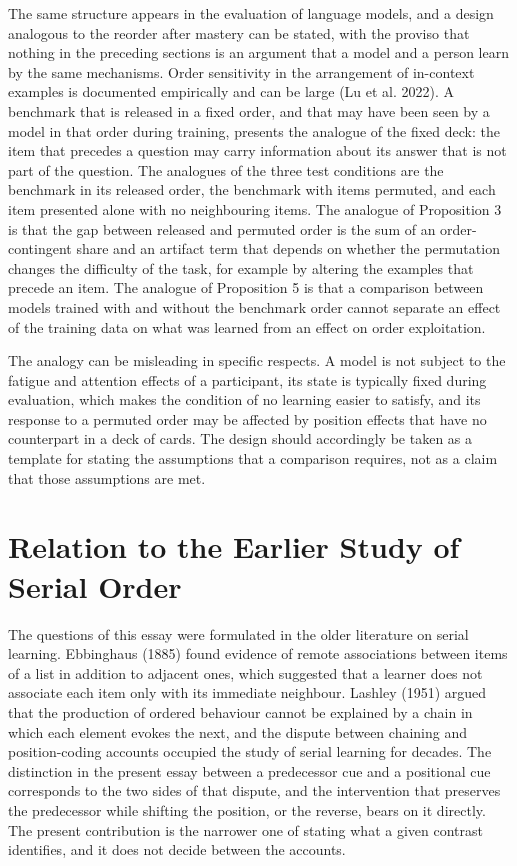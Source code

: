 \documentclass[11pt]{article}
\theoremstyle{remark}
\begin{document}
The same structure appears in the evaluation of language models, and a design analogous to the reorder after mastery can be stated, with the proviso that nothing in the preceding sections is an argument that a model and a person learn by the same mechanisms. Order sensitivity in the arrangement of in-context examples is documented empirically and can be large (Lu et al. 2022). A benchmark that is released in a fixed order, and that may have been seen by a model in that order during training, presents the analogue of the fixed deck: the item that precedes a question may carry information about its answer that is not part of the question. The analogues of the three test conditions are the benchmark in its released order, the benchmark with items permuted, and each item presented alone with no neighbouring items. The analogue of Proposition 3 is that the gap between released and permuted order is the sum of an order-contingent share and an artifact term that depends on whether the permutation changes the difficulty of the task, for example by altering the examples that precede an item. The analogue of Proposition 5 is that a comparison between models trained with and without the benchmark order cannot separate an effect of the training data on what was learned from an effect on order exploitation.

The analogy can be misleading in specific respects. A model is not subject to the fatigue and attention effects of a participant, its state is typically fixed during evaluation, which makes the condition of no learning easier to satisfy, and its response to a permuted order may be affected by position effects that have no counterpart in a deck of cards. The design should accordingly be taken as a template for stating the assumptions that a comparison requires, not as a claim that those assumptions are met.

\section{Relation to the Earlier Study of Serial Order}

The questions of this essay were formulated in the older literature on serial learning. Ebbinghaus (1885) found evidence of remote associations between items of a list in addition to adjacent ones, which suggested that a learner does not associate each item only with its immediate neighbour. Lashley (1951) argued that the production of ordered behaviour cannot be explained by a chain in which each element evokes the next, and the dispute between chaining and position-coding accounts occupied the study of serial learning for decades. The distinction in the present essay between a predecessor cue and a positional cue corresponds to the two sides of that dispute, and the intervention that preserves the predecessor while shifting the position, or the reverse, bears on it directly. The present contribution is the narrower one of stating what a given contrast identifies, and it does not decide between the accounts.
\end{document}
